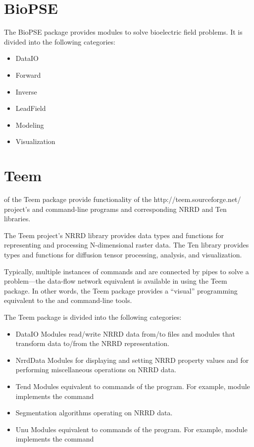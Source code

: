 \section{BioPSE}
\label{sec:biopsepackage}


The BioPSE package provides modules to solve bioelectric field
problems.  It is divided into the following categories:

\begin{itemize}
\item DataIO
\item Forward
\item Inverse
\item LeadField
\item Modeling
\item Visualization
\end{itemize}

\section{Teem}
\label{sec:teempackage}

 of the Teem
package provide functionality of the 
{http://teem.sourceforge.net/} project's  and
 command-line programs and corresponding NRRD and Ten
libraries.

The Teem project's NRRD library provides data types and functions for
representing and processing N-dimensional raster data.  The Ten
library provides types and functions for diffusion tensor processing,
analysis, and visualization.

Typically, multiple instances of commands  and
 are connected by pipes to solve a problem---the
data-flow network equivalent is available in \sr{} using the Teem
package.  In other words, the Teem package provides a
``visual'' programming equivalent to the  and
 command-line tools.

The Teem package is divided into the following categories:

\begin{itemize}
\item DataIO Modules read/write NRRD data from/to files and
  modules that transform data to/from the NRRD representation.
\item NrrdData Modules for displaying and setting NRRD property values
  and for performing miscellaneous operations on NRRD data.
\item Tend Modules equivalent to commands of the 
  program.  For example, module  implements the
  command 
\item Segmentation  algorithms operating on NRRD data.
\item Unu Modules equivalent to commands of the  program.
  For example, module  implements the command
\end{itemize}

